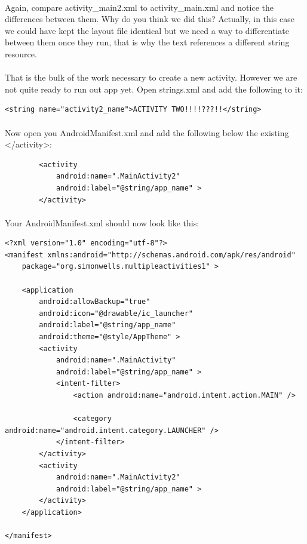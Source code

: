 \documentclass[12pt, a4paper, twoside]{book}
\begin{document}
\paragraph{} Again, compare activity\_main2.xml to activity\_main.xml and notice the differences between them. Why do you think we did this? Actually, in this case we could have kept the layout file identical but we need a way to differentiate between them once they run, that is why the text references a different string resource.

\paragraph{} That is the bulk of the work necessary to create a new activity. However we are not quite ready to run out app yet. Open strings.xml and add the following to it:

\begin{lstlisting}
<string name="activity2_name">ACTIVITY TWO!!!!???!!</string>
\end{lstlisting}

\paragraph{} Now open you AndroidManifest.xml and add the following below the existing </activity>:

\begin{lstlisting}
        <activity
            android:name=".MainActivity2"
            android:label="@string/app_name" >
        </activity>
\end{lstlisting}

\paragraph{} Your AndroidManifest.xml should now look like this:

\begin{lstlisting}
<?xml version="1.0" encoding="utf-8"?>
<manifest xmlns:android="http://schemas.android.com/apk/res/android"
    package="org.simonwells.multipleactivities1" >

    <application
        android:allowBackup="true"
        android:icon="@drawable/ic_launcher"
        android:label="@string/app_name"
        android:theme="@style/AppTheme" >
        <activity
            android:name=".MainActivity"
            android:label="@string/app_name" >
            <intent-filter>
                <action android:name="android.intent.action.MAIN" />

                <category android:name="android.intent.category.LAUNCHER" />
            </intent-filter>
        </activity>
        <activity
            android:name=".MainActivity2"
            android:label="@string/app_name" >
        </activity>
    </application>

</manifest>
\end{lstlisting}
\end{document}
